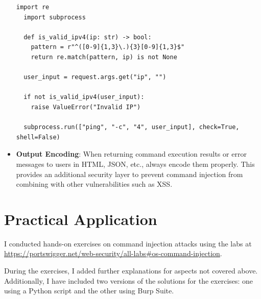 \documentclass{article}
\begin{document}
\begin{itemize}
  \begin{lstlisting}[caption={Python: Using subprocess.run (shell=False) with Input Validation}]
  import re
  import subprocess

  def is_valid_ipv4(ip: str) -> bool:
    pattern = r"^([0-9]{1,3}\.){3}[0-9]{1,3}$"
    return re.match(pattern, ip) is not None

  user_input = request.args.get("ip", "")

  if not is_valid_ipv4(user_input):
    raise ValueError("Invalid IP")

  subprocess.run(["ping", "-c", "4", user_input], check=True, shell=False)
  \end{lstlisting}

  \item \textbf{Output Encoding}: When returning command execution results or error messages to users in HTML, JSON, etc., always encode them properly. This provides an additional security layer to prevent command injection from combining with other vulnerabilities such as XSS.
\end{itemize}

\newpage
\section*{Practical Application}
I conducted hands-on exercises on command injection attacks using the labs at \url{https://portswigger.net/web-security/all-labs#os-command-injection}.

During the exercises, I added further explanations for aspects not covered above.
Additionally, I have included two versions of the solutions for the exercises: one using a Python script and the other using Burp Suite.
\end{document}

